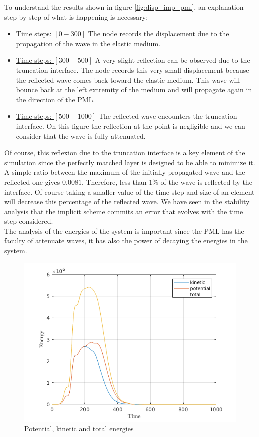 To understand the results shown in figure \ref{fig:disp_imp_pml}, an explanation step by step of what is happening is necessary:
\begin{itemize}
\item \underline{Time steps: $[0-300]$} The node records the displacement due to the propagation of the wave in the elastic medium.  
\item \underline{Time steps: $[300-500]$} A very slight reflection can be observed due to the truncation interface. The node records this very small displacement because the reflected wave comes back toward the elastic medium. This wave will bounce back at the left extremity of the medium and will propagate again in the direction of the PML.
\item \underline{Time steps: $[500-1000]$} The reflected wave encounters the truncation interface. On this figure the reflection at the point is negligible and we can consider that the wave is fully attenuated. 
\end{itemize}
Of course, this reflexion due to the truncation interface is a key element of the simulation since the perfectly matched layer is designed to be able to minimize it. A simple ratio between the maximum of the initially propagated wave and the reflected one gives $0.0081$. Therefore, less than $1\%$ of the wave is reflected by the interface.
Of course taking a smaller value of the time step and size of an element will decrease this percentage of the reflected wave. We have seen in the stability analysis that the implicit scheme commits an error that evolves with the time step considered.\\
The analysis of the energies of the system is important since the PML has the faculty of attenuate waves, it has also the power of decaying the energies in the system.
\begin{figure}[H]
  \centering
  \includegraphics[scale=0.8]{images/simple_test_energies_imp.png}
  \caption{Potential, kinetic and total energies}
  \label{fig:simple_test_en_imp}
\end{figure}          
